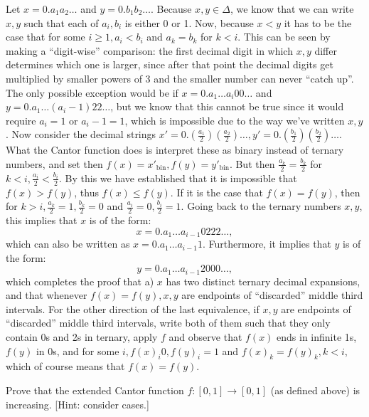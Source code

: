 \begin{solution}
    
    Let $x = 0.a_1 a_2 \ldots$ and $y = 0.b_1 b_2 \ldots$.
    Because $x, y \in \Delta$, we know that we can write $x, y$ such that each of $a_i, b_i$ is either 0 or 1.
    Now, because $x < y$ it has to be the case that for some $i \geq 1, a_i < b_i$ and $a_k = b_k$ for $k < i$.
    This can be seen by making a ``digit-wise'' comparison: the first decimal digit in which $x, y$ differ determines which one is larger, since after that point the decimal digits get multiplied by smaller powers of 3 and the smaller number can never ``catch up''.
    The only possible exception would be if $x = 0.a_1 \ldots a_i 0 0 \ldots$ and $y = 0.a_1 \ldots (a_i - 1) 2 2 \ldots$, but we know that this cannot be true since it would require $a_i = 1$ or $a_i - 1 = 1$, which is impossible due to the way we've written $x, y$.
    Now consider the decimal strings $x' = 0.(\frac{a_1}{2}) (\frac{a_2}{2}) \ldots, y' = 0.(\frac{b_1}{2}) ( \frac{b_2}{2}) \ldots$.
    What the Cantor function does is interpret these as binary instead of ternary numbers, and set then $f(x) = x'_{\text{bin}}, f(y) = y'_{\text{bin}}$.
    But then $\frac{a_k}{2} = \frac{b_k}{2}$ for $k < i, \frac{a_i}{2} < \frac{b_i}{2}$.
    By this we have established that it is impossible that $f(x) > f(y)$, thus $f(x) \leq f(y)$.
    If it is the case that $f(x) = f(y)$, then for $k > i, \frac{a_k}{2} = 1, \frac{b_k}{2} = 0$ and $\frac{a_i}{2} = 0, \frac{b_i}{2} = 1$.
    Going back to the ternary numbers $x, y$, this implies that $x$ is of the form:
    $$x = 0.a_1 \ldots a_{i-1} 0 2 2 2 \ldots,$$
    which can also be written as $x = 0.a_1 \ldots a_{i-1} 1$.
    Furthermore, it implies that $y$ is of the form:
    $$y = 0.a_1 \ldots a_{i-1} 2 0 0 0 \ldots,$$
    which completes the proof that a) $x$ has two distinct ternary decimal expansions, and that whenever $f(x) = f(y), x, y$ are endpoints of ``discarded'' middle third intervals.
    For the other direction of the last equivalence, if $x, y$ are endpoints of ``discarded'' middle third intervals, write both of them such that they only contain 0s and 2s in ternary, apply $f$ and observe that $f(x)$ ends in infinite 1s, $f(y)$ in 0s, and for some $i, f(x)_i 0, f(y)_i = 1$ and $f(x)_k = f(y)_k, k < i$, which of course means that $f(x) = f(y)$.
\end{solution}

\begin{exercise}{29}
    Prove that the extended Cantor function $f: [0, 1] \rightarrow [0, 1]$ (as defined above) is increasing. [Hint: consider cases.]
\end{exercise}


